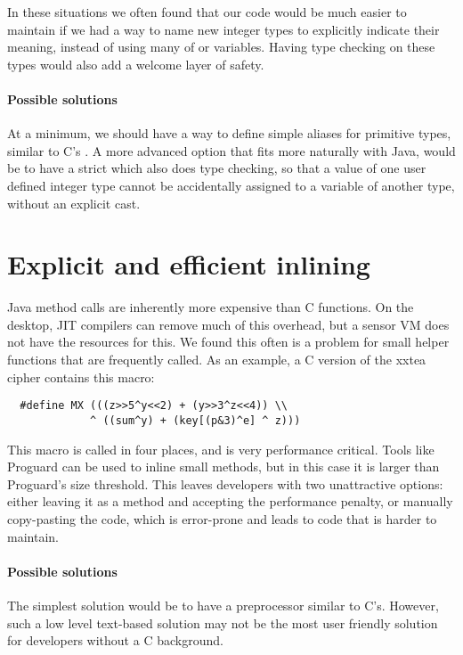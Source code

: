 In these situations we often found that our code would be much easier to maintain if we had a way to name new integer types to explicitly indicate their meaning, instead of using many of  or  variables. Having type checking on these types would also add a welcome layer of safety.

\paragraph{Possible solutions}
At a minimum, we should have a way to define simple aliases for primitive types, similar to C's . A more advanced option that fits more naturally with Java, would be to have a strict  which also does type checking, so that a value of one user defined integer type cannot be accidentally assigned to a variable of another type, without an explicit cast.




\section{Explicit and efficient inlining}
\label{sec-inlining}
Java method calls are inherently more expensive than C functions. On the desktop, JIT compilers can remove much of this overhead, but a sensor VM does not have the resources for this. We found this often is a problem for small helper functions that are frequently called. As an example, a C version of the xxtea cipher \cite{Wheeler:1998} contains this macro: 
\begin{verbatim}
  #define MX (((z>>5^y<<2) + (y>>3^z<<4)) \\
             ^ ((sum^y) + (key[(p&3)^e] ^ z)))
\end{verbatim}

This macro is called in four places, and is very performance critical. Tools like Proguard \cite{proguard} can be used to inline small methods, but in this case it is larger than Proguard's size threshold. This leaves developers with two unattractive options: either leaving it as a method and accepting the performance penalty, or manually copy-pasting the code, which is error-prone and leads to code that is harder to maintain.

\paragraph{Possible solutions}
The simplest solution would be to have a preprocessor similar to C's. However, such a low level text-based solution may not be the most user friendly solution for developers without a C background.

